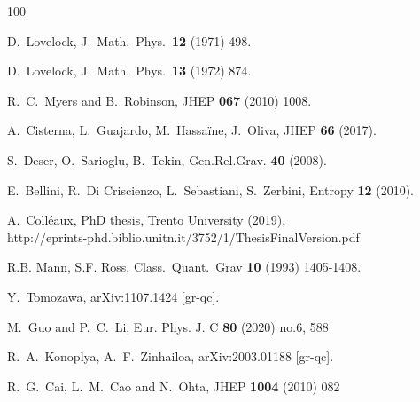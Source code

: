 \documentclass[aps,prd,preprint,nofootinbib]{revtex4-1}
\begin{document}
\begin{thebibliography}{100}

 D.~Lovelock,
  J.\ Math.\ Phys.\  {\bf 12} (1971) 498.

 D.~Lovelock,
  J.\ Math.\ Phys.\  {\bf 13} (1972) 874.

 R.~C.~Myers and B.~Robinson,
  JHEP  {\bf 067} (2010) 1008.

 A.~Cisterna, L.~Guajardo, M.~Hassaïne, J.~Oliva,
 JHEP  {\bf 66} (2017).

 S.~Deser, O.~Sarioglu, B.~Tekin, 
Gen.Rel.Grav. {\bf 40} (2008).

 E.~Bellini, R.~Di Criscienzo, L.~Sebastiani, S.~Zerbini,
Entropy {\bf 12} (2010).

 A.~Coll\'eaux,  
PhD thesis, Trento University (2019), \\
http://eprints-phd.biblio.unitn.it/3752/1/ThesisFinalVersion.pdf

 R.B. Mann, S.F. Ross,
Class.\ Quant.\ Grav {\bf 10} (1993) 1405-1408.

 Y.~Tomozawa,
  arXiv:1107.1424 [gr-qc].

 M.~Guo and P.~C.~Li,
Eur. Phys. J. C \textbf{80} (2020) no.6, 588

 R.~A.~Konoplya, A.~F.~Zinhailoa,
   arXiv:2003.01188 [gr-qc].

 R.~G.~Cai, L.~M.~Cao and N.~Ohta,
  JHEP {\bf 1004} (2010) 082


\end{thebibliography}
\end{document}
